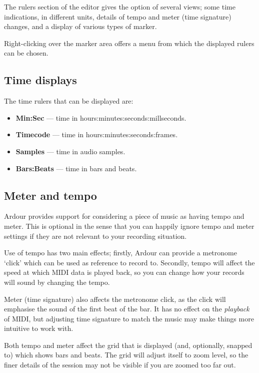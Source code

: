 \documentclass[10pt,a4paper]{book}
\begin{document}
{The rulers section of the editor gives the option of several views;
some time indications, in different units, details of tempo and meter
(time signature) changes, and a display of various types of marker.

Right-clicking over the marker area offers a menu from which the
displayed rulers can be chosen.

\subsection{Time displays}

The time rulers that can be displayed are:
\begin{itemize}
\item \textbf{Min:Sec} --- time in hours:minutes:seconds:millseconds.
\item \textbf{Timecode} --- time in hours:minutes:seconds:frames.
\item \textbf{Samples} --- time in audio samples.
\item \textbf{Bars:Beats} --- time in bars and beats.
\end{itemize}

\subsection{Meter and tempo}

Ardour provides support for considering a piece of music as having
tempo and meter.  This is optional in the sense that you can happily
ignore tempo and meter settings if they are not relevant to your
recording situation.

Use of tempo has two main effects; firstly, Ardour can provide a
metronome `click' which can be used as reference to record to.
Secondly, tempo will affect the speed at which MIDI data is played
back, so you can change how your records will sound by changing the
tempo.

Meter (time signature) also affects the metronome click, as the click
will emphasise the sound of the first beat of the bar.  It has no
effect on the \emph{playback} of MIDI, but adjusting time signature to
match the music may make things more intuitive to work with.

Both tempo and meter affect the grid that is displayed (and,
optionally, snapped to) which shows bars and beats.  The grid will
adjust itself to zoom level, so the finer details of the session may
not be visible if you are zoomed too far out.

}
\end{document}
